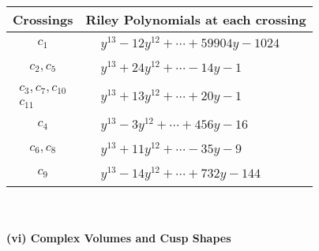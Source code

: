 \documentclass[1p]{elsarticle_modified}
\theoremstyle{definition}
\begin{document}
\begin{tabular}{m{50pt}|m{274pt}}
Crossings & \hspace{64pt}Riley Polynomials at each crossing \\
\hline $$\begin{aligned}c_{1}\end{aligned}$$&$\begin{aligned}
&y^{13}-12 y^{12}+\cdots+59904 y-1024
\end{aligned}$\\
\hline $$\begin{aligned}c_{2},c_{5}\end{aligned}$$&$\begin{aligned}
&y^{13}+24 y^{12}+\cdots-14 y-1
\end{aligned}$\\
\hline $$\begin{aligned}c_{3},c_{7},c_{10}\\c_{11}\end{aligned}$$&$\begin{aligned}
&y^{13}+13 y^{12}+\cdots+20 y-1
\end{aligned}$\\
\hline $$\begin{aligned}c_{4}\end{aligned}$$&$\begin{aligned}
&y^{13}-3 y^{12}+\cdots+456 y-16
\end{aligned}$\\
\hline $$\begin{aligned}c_{6},c_{8}\end{aligned}$$&$\begin{aligned}
&y^{13}+11 y^{12}+\cdots-35 y-9
\end{aligned}$\\
\hline $$\begin{aligned}c_{9}\end{aligned}$$&$\begin{aligned}
&y^{13}-14 y^{12}+\cdots+732 y-144
\end{aligned}$\\
\hline
\end{tabular}\\~\\
\newpage\flushleft \textbf{(vi) Complex Volumes and Cusp Shapes}
\end{document}

